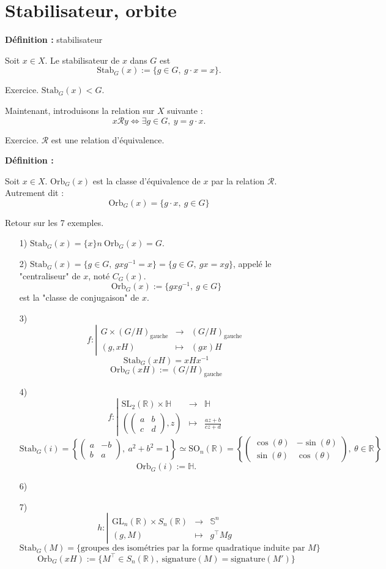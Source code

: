 \documentclass{report}
\newenvironment{definition}[1][]{
    \begin{tcolorbox}[colframe= white]
    \textbf{Définition :} 
    #1 \par
    }
    {\end{tcolorbox}}
\newcommand{\ssi}{\Longleftrightarrow}
\newcommand{\R}{\mathbb{R}}
\newcommand{\mc}{\mathcal}
\newcommand{\D}{\right}
\newcommand{\G}{\left}
\newcommand{\fonctions}[5]{\begin{displaymath}#1:\left| \begin{array}{ccc}
 #2 & \longrightarrow & #3 \\
    #4 & \longmapsto & #5 \end{array}\right.\end{displaymath}}
\begin{document}
\section{Stabilisateur, orbite}
\par
\begin{definition}[stabilisateur] 
Soit $x\in X$. Le stabilisateur de $x$ dans $G$ est 
$$\text{Stab}_G(x):=\{g\in G,\ g\cdot x=x\}.$$
\end{definition}
\par
Exercice. $\text{Stab}_G(x)<G$. 
\par
Maintenant, introduisons la relation sur $X$ suivante : 
$$x\mc{R}y\ssi\exists g\in G,\ y=g\cdot x.$$
\par
Exercice. $\mc{R}$ est une relation d'équivalence. 
\par
\begin{definition}[] 
Soit $x\in X$. $\text{Orb}_G(x)$ est la classe d'équivalence de $x$ par la relation $\mc{R}$. Autrement dit : 
$$\text{Orb}_G(x)=\{g\cdot x,\ g\in G\}$$
\end{definition}
\par
Retour sur les 7 exemples. 
\par
\begin{itemize}
\item[1)] $\text{Stab}_G(x)=\{x\}n\ \text{Orb}_G(x)=G$. 
\item[2)] $\text{Stab}_G(x)=\{g\in G,\ gxg^{-1}=x\}=\{g\in G,\ gx=xg\}$, appelé le "centraliseur" de $x$, noté $C_G(x)$. 
$$\text{Orb}_G(x):=\{gxg^{-1},\ g\in G\}$$
est la "classe de conjugaison" de $x$.
\item[3)] \fonctions{f}{G\times (G/H)_{\text{gauche}}}{(G/H)_{\text{gauche}}}{(g,xH)}{(gx)H}
$$\text{Stab}_G(xH)=xHx^{-1}$$
$$\text{Orb}_G(xH):=(G/H)_{\text{gauche}}$$
\item[4)] \fonctions{f}{\text{SL}_2(\R)\times \mathbb{H}}{\mathbb{H}}{\G(\begin{pmatrix}a&b\\ c&d\end{pmatrix} ,z\D)}{\frac{az+b}{cz+d}}
$$\text{Stab}_G(i)=\G\{\begin{pmatrix}a&-b\\ b&a\end{pmatrix},\ a^2+b^2=1\D\}\simeq \text{SO}_n(\R)=\G\{\begin{pmatrix}\cos(\theta)&-\sin(\theta)\\ \sin(\theta)&\cos(\theta)\end{pmatrix},\ \theta\in\R\D\}$$
$$\text{Orb}_G(i):=\mathbb{H}.$$
\item[6)]
\item[7)] \fonctions{h}{\text{GL}_n(\R)\times S_n(\R)}{\mathbb{S}^n}{(g,M)}{g^{\top}Mg}
$$\text{Stab}_G(M)=\{\text{groupes des isométries par la forme quadratique induite par }M\}$$
$$\text{Orb}_G(xH):=\{M^{\top}\in S_n(\R),\ \text{signature}(M)=\text{signature}(M')\}$$
\end{itemize} 
\end{document}
